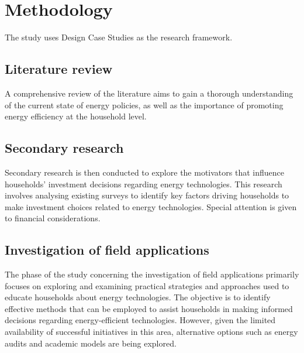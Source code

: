 \chapter{Methodology} 

The study uses Design Case Studies \cite{dcs} as the research framework. 


\section{Literature review}

A comprehensive review of the literature aims to gain a thorough understanding of the current state of energy policies, 
as well as the importance of promoting energy efficiency at the household level.


\section{Secondary research}

Secondary research is then conducted to explore the motivators that influence households' investment decisions regarding energy technologies.
This research involves analysing existing surveys to identify key factors driving households to make investment choices related to energy technologies. 
Special attention is given to financial considerations. 


\section{Investigation of field applications}

The phase of the study concerning the investigation of field applications primarily focuses on exploring and examining practical strategies and approaches used to educate households about energy technologies. 
The objective is to identify effective methods that can be employed to assist households in making informed decisions regarding energy-efficient technologies. 
However, given the limited availability of successful initiatives in this area, alternative options such as energy audits and academic models are being explored.

